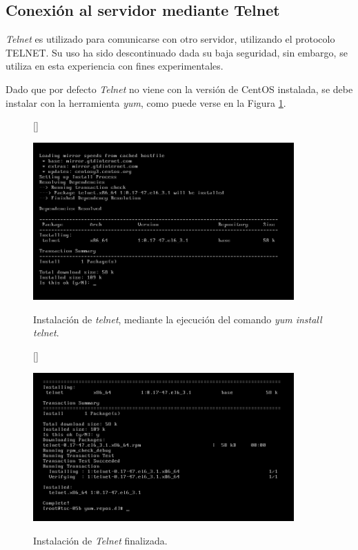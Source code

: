 \documentclass[11pt]{article}
\begin{document}
\subsection{Conexión al servidor mediante Telnet}
\textit{Telnet} es utilizado para comunicarse con otro servidor, utilizando el protocolo TELNET. Su uso ha sido descontinuado dada su baja seguridad, sin embargo, se utiliza en esta experiencia con fines experimentales.\par
Dado que por defecto \textit{Telnet} no viene con la versión de CentOS instalada, se debe instalar con la herramienta \textit{yum}, como puede verse en la Figura \ref{fig:telnetInstall}.
\clearpage

\begin{figure}[ht]
[\FBwidth]
{\caption{Instalación de \textit{telnet}, mediante la ejecución del comando \textit{yum install telnet}.}\label{fig:telnetInstall}}
{\includegraphics[width=10cm]{screenshots/telnet-install/telnet-install.png}}
\end{figure}

\begin{figure}[ht]
[\FBwidth]
{\caption{Instalación de \textit{Telnet} finalizada.}\label{fig:telnetInstalled}}
{\includegraphics[width=10cm]{screenshots/telnet-install/telnet-instalacion-completa.png}}
\end{figure}
\end{document}
